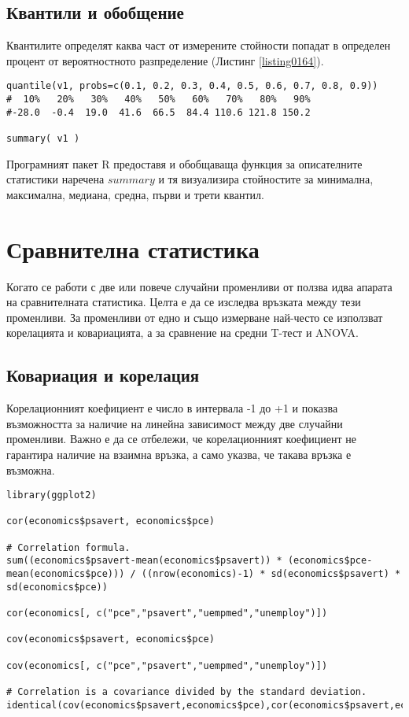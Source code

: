 \subsection{Квантили и обобщение}

Квантилите определят каква част от измерените стойности попадат в определен процент от вероятностното разпределение (Листинг \ref{listing0164}).

\begin{lstlisting}[caption=Квантили и обобщение, label=listing0165]
quantile(v1, probs=c(0.1, 0.2, 0.3, 0.4, 0.5, 0.6, 0.7, 0.8, 0.9))
#  10%   20%   30%   40%   50%   60%   70%   80%   90% 
#-28.0  -0.4  19.0  41.6  66.5  84.4 110.6 121.8 150.2 

summary( v1 )
\end{lstlisting}

Програмният пакет R предоставя и обобщаваща функция за описателните статистики наречена $summary$ и тя визуализира стойностите за минимална, максимална, медиана, средна, първи и трети квантил.

\section{Сравнителна статистика}

Когато се работи с две или повече случайни променливи от ползва идва апарата на сравнителната статистика. Целта е да се изследва връзката между тези променливи. За променливи от едно и също измерване най-често се използват корелацията и ковариацията, а за сравнение на средни T-тест и ANOVA. 

\subsection{Ковариация и корелация}

Корелационният коефициент е число в интервала -1 до +1 и показва възможността за наличие на линейна зависимост между две случайни променливи. Важно е да се отбележи, че корелационният коефициент не гарантира наличие на взаимна връзка, а само указва, че такава връзка е възможна. 

\begin{lstlisting}[caption=Ковариация и корелация, label=listing0166]
library(ggplot2)

cor(economics$psavert, economics$pce)

# Correlation formula.
sum((economics$psavert-mean(economics$psavert)) * (economics$pce-mean(economics$pce))) / ((nrow(economics)-1) * sd(economics$psavert) * sd(economics$pce))

cor(economics[, c("pce","psavert","uempmed","unemploy")])

cov(economics$psavert, economics$pce)

cov(economics[, c("pce","psavert","uempmed","unemploy")])

# Correlation is a covariance divided by the standard deviation.
identical(cov(economics$psavert,economics$pce),cor(economics$psavert,economics$pce)*sd(economics$psavert)*sd(economics$pce))
\end{lstlisting}

